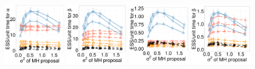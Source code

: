   \begin{figure}[H]
  \centering
  \begin{minipage}[h!]{0.99\linewidth}
  \centering
    \includegraphics [width=0.24\textwidth, angle=0]{figs/new_whole_exp_figs/exp_alpha_dim3.pdf}
    \includegraphics [width=0.24\textwidth, angle=0]{figs/new_whole_exp_figs/exp_beta_dim3.pdf}
    \includegraphics [width=0.24\textwidth, angle=0]{figs/new_whole_exp_figs/exp_alpha_dim10.pdf}
    \includegraphics [width=0.24\textwidth, angle=0]{figs/new_whole_exp_figs/exp_beta_dim10.pdf}
  \end{minipage}


\end{figure}
